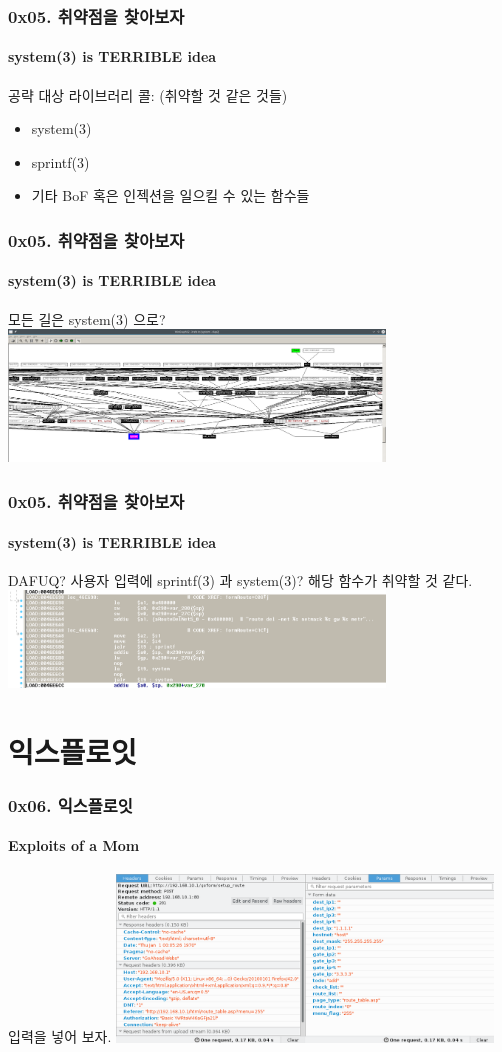 \documentclass {beamer}
\begin{document}
\begin{frame}
  \frametitle{0x05. 취약점을 찾아보자}
  \framesubtitle{system(3) is TERRIBLE idea}

  공략 대상 라이브러리 콜: (취약할 것 같은 것들)
  \begin {itemize}
  \item system(3)
  \item sprintf(3)
  \item 기타 BoF 혹은 인젝션을 일으킬 수 있는 함수들
  \end{itemize}
\end{frame}

\begin{frame}
  \frametitle{0x05. 취약점을 찾아보자}
  \framesubtitle{system(3) is TERRIBLE idea}

  모든 길은 system(3) 으로?
  \includegraphics [width=100mm]{img/webs_system3_xref.png}
\end{frame}

\begin{frame}
  \frametitle{0x05. 취약점을 찾아보자}
  \framesubtitle{system(3) is TERRIBLE idea}

  DAFUQ? 사용자 입력에 sprintf(3) 과 system(3)?\linebreak
  해당 함수가 취약할 것 같다. 
  \includegraphics [width=100mm]{img/webs_system3_sprintf.png}
\end{frame}

\section[Section]{익스플로잇}
\begin{frame}
  \frametitle{0x06. 익스플로잇}
  \framesubtitle{Exploits of a Mom}

  입력을 넣어 보자.
  \includegraphics [width=100mm]{img/webs_setup_route.png}
\end{frame}
\end{document}
